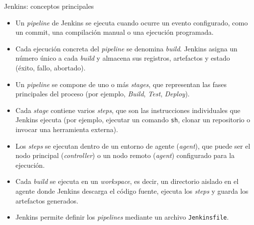 \documentclass{beamer}
\begin{document}
\begin{frame}{Jenkins: conceptos principales}

{\scriptsize

\begin{itemize}
    \item Un \textit{pipeline} de Jenkins se ejecuta cuando ocurre un evento configurado, como un commit, una compilación manual o una ejecución programada.

    \pause
    
    \item Cada ejecución concreta del \textit{pipeline} se denomina \textit{build}. Jenkins asigna un número único a cada \textit{build} y almacena sus registros, artefactos y estado (éxito, fallo, abortado).

    \pause
    
    \item Un \textit{pipeline} se compone de uno o más \textit{stages}, que representan las fases principales del proceso (por ejemplo, \textit{Build}, \textit{Test}, \textit{Deploy}).

    \pause
    
    \item Cada \textit{stage} contiene varios \textit{steps}, que son las instrucciones individuales que Jenkins ejecuta (por ejemplo, ejecutar un comando \texttt{sh}, clonar un repositorio o invocar una herramienta externa).

    \pause 
    
    \item Los \textit{steps} se ejecutan dentro de un entorno de agente (\textit{agent}), que puede ser el nodo principal (\textit{controller}) o un nodo remoto (\textit{agent}) configurado para la ejecución.

    \pause
    \item Cada \textit{build} se ejecuta en un \textit{workspace}, es decir, un directorio aislado en el agente donde Jenkins descarga el código fuente, ejecuta los \textit{steps} y guarda los artefactos generados.

    \pause
    
    \item Jenkins permite definir los \textit{pipelines} mediante un archivo \texttt{Jenkinsfile}.
\end{itemize}

}
    
\end{frame}
\end{document}
